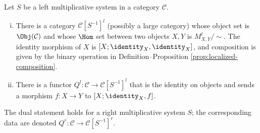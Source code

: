 \begin{definition-theorem}\label{def:fraction-localization}
	Let $S$ be a left multiplicative system in a category $\mathcal{C}$.
	\begin{enumerate}[(i)]
		\item There is a category $\mathcal{C}[S^{-1}]^l$ (possibly a large
		category) whose object set is $\Obj(\mathcal{C})$ and whose $\Hom$ set
		between two objects $X,Y$ is $M_{X,Y}^l/\sim$. The identity morphism of
		$X$ is $[X;\identity_X,\identity_X]$, and composition is given by the
		binary operation in Definition--Proposition
		\ref{prop:localized-composition}.
		\item There is a functor
		$Q^l:\mathcal{C}\to\mathcal{C}[S^{-1}]^l$ that is the identity on
		objects and sends a morphism $f:X\to Y$ to
		$[X;\identity_X,f]$.
	\end{enumerate}
	The dual statement holds for a right multiplicative system $S$; the
	corresponding data are denoted
	$Q^r:\mathcal{C}\to\mathcal{C}[S^{-1}]^r$.
\end{definition-theorem}
